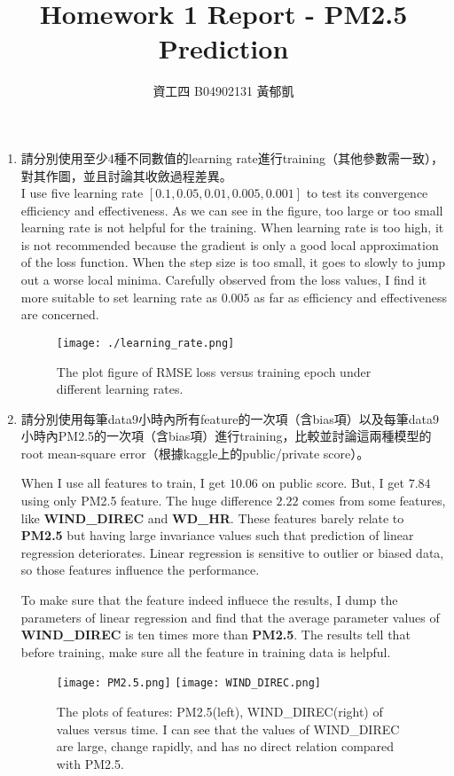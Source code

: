 \documentclass[12pt, a4paper]{article}
\author{資工四 B04902131 黃郁凱}
\title{\vspace{-2cm} Homework 1 Report - PM2.5 Prediction}
\begin{document}
\maketitle

\begin{enumerate}
\item 請分別使用至少4種不同數值的learning rate進行training（其他參數需一致），對其作圖，並且討論其收斂過程差異。\\
I use five learning rate $[0.1, 0.05, 0.01, 0.005, 0.001]$ to test its convergence efficiency and effectiveness. As we can see in the figure, too large or too small learning rate is not helpful for the training. When learning rate is too high, it is not recommended because the gradient is only a good local approximation of the loss function. When the step size is too small, it goes to slowly to jump out a worse local minima. Carefully observed from the loss values, I find it more suitable to set learning rate as $0.005$ as far as efficiency and effectiveness are concerned. 
\begin{figure}[H]
    \centering
    \texttt{[image: ./learning\_rate.png]}
    \caption{The plot figure of RMSE loss versus training epoch under different learning rates.}
\end{figure}

\item 請分別使用每筆data9小時內所有feature的一次項（含bias項）以及每筆data9小時內PM2.5的一次項（含bias項）進行training，比較並討論這兩種模型的root mean-square error（根據kaggle上的public/private score）。\par
When I use all features to train, I get $10.06$ on public score. But, I get $7.84$ using only PM2.5 feature. The huge difference $2.22$ comes from some features, like \textbf{WIND\_DIREC} and \textbf{WD\_HR}. These features barely relate to \textbf{PM2.5} but having large invariance values such that prediction of linear regression deteriorates. Linear regression is sensitive to outlier or biased data, so those features influence the performance.\par
To make sure that the feature indeed influece the results, I dump the parameters of linear regression and find that the average parameter values of \textbf{WIND\_DIREC} is ten times more than \textbf{PM2.5}. The results tell that before training, make sure all the feature in training data is helpful.

\begin{figure}[H]
    \centering
    \texttt{[image: PM2.5.png]}
    \texttt{[image: WIND\_DIREC.png]}
    \caption{The plots of features: PM2.5(left), WIND\_DIREC(right) of values versus time. I can see that the values of WIND\_DIREC are large, change rapidly, and has no direct relation compared with PM2.5.}
\end{figure}


\end{enumerate}
\end{document}
